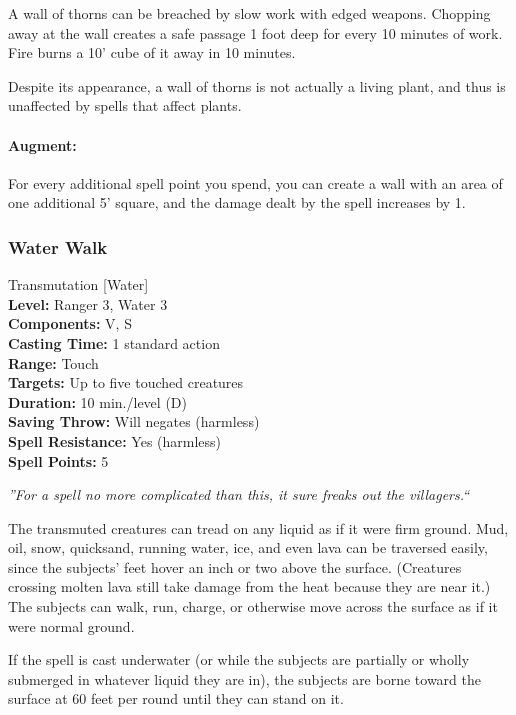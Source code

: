 A wall of thorns can be breached by slow work with edged weapons. Chopping away at the wall creates a safe passage 1 foot deep for every 10 minutes of work. Fire burns a 10' cube of it away in 10 minutes.

Despite its appearance, a wall of thorns is not actually a living plant, and thus is unaffected by spells that affect plants.

\paragraph{Augment:} For every additional spell point you spend, you can create a wall with an area of one additional 5' square, and the damage dealt by the spell increases by 1.

\subsubsection{Water Walk}
\label{Spell:WaterWalk}
Transmutation [Water]
\\ \textbf{Level:} Ranger 3, Water 3
\\ \textbf{Components:} V, S
\\ \textbf{Casting Time:} 1 standard action
\\ \textbf{Range:} Touch
\\ \textbf{Targets:} Up to five touched creatures
\\ \textbf{Duration:} 10 min./level (D)
\\ \textbf{Saving Throw:} Will negates (harmless)
\\ \textbf{Spell Resistance:} Yes (harmless)
\\ \textbf{Spell Points:} 5

\emph{''For a spell no more complicated than this, it sure freaks out the villagers.``}

The transmuted creatures can tread on any liquid as if it were firm ground. 
Mud, oil, snow, quicksand, running water, ice, and even lava can be traversed easily, since the subjects' feet hover an inch or two above the surface. 
(Creatures crossing molten lava still take damage from the heat because they are near it.) 
The subjects can walk, run, charge, or otherwise move across the surface as if it were normal ground.

If the spell is cast underwater (or while the subjects are partially or wholly submerged in whatever liquid they are in), the subjects are borne toward the surface at 60 feet per round until they can stand on it.


